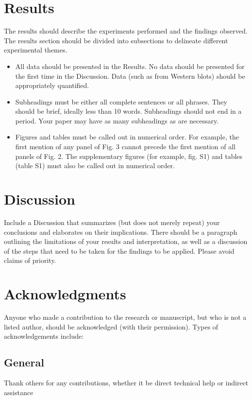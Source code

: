 \documentclass{article}
\begin{document}
\section{Results}
The results should describe the experiments performed and the findings observed. The results section should be divided into subsections to delineate different experimental themes. 
\begin{itemize}
    \item All data should be presented in the Results. No data should be presented for the first time in the Discussion. Data (such as from Western blots) should be appropriately quantified.
    \item Subheadings must be either all complete sentences or all phrases. They should be brief, ideally less than 10 words. Subheadings should not end in a period. Your paper may have as many subheadings as are necessary.
    \item Figures and tables must be called out in numerical order. For example, the first mention of any panel of Fig. 3 cannot precede the first mention of all panels of Fig. 2. The supplementary figures (for example, fig. S1) and tables (table S1) must also be called out in numerical order. 
\end{itemize}

\section{Discussion}
Include a Discussion that summarizes (but does not merely repeat) your conclusions and elaborates on their implications. There should be a paragraph outlining the limitations of your results and interpretation, as well as a discussion of the steps that need to be taken for the findings to be applied. Please avoid claims of priority. 

\section*{Acknowledgments}
Anyone who made a contribution to the research or manuscript, but who is not a listed author, should be acknowledged (with their permission). Types of acknowledgements include:

\subsection*{General} 
Thank others for any contributions, whether it be direct technical help or indirect assistance 
\end{document}
